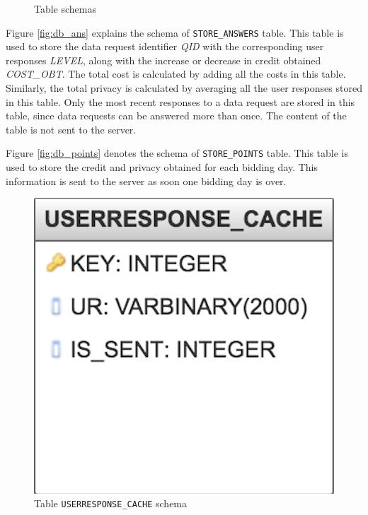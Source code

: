 \begin{figure}[htp]
 \hspace{1em}
\caption{Table schemas}
\label{fig:ts11}
\end{figure}

Figure \ref{fig:db_ans} explains the schema of \texttt{STORE\_ANSWERS} table. This table is used to store the data request identifier \textit{QID} with the corresponding
user responses \textit{LEVEL}, along with the increase or decrease in credit obtained \textit{COST\_OBT}. The total cost is calculated by adding all the costs in this table. Similarly, the total privacy is calculated by averaging all the user responses stored in this table. Only the most recent responses to a data request are stored in this table, since data requests can be answered more than once. The content of the table is not sent to the server.

Figure \ref{fig:db_points} denotes the schema of \texttt{STORE\_POINTS} table. This table is used to store the credit and privacy obtained for each bidding day.
This information is sent to the server as soon one bidding day is over.

\begin{figure}[ht!]
\centering
\includegraphics[width=0.4\linewidth]{./images/db_ur}
\caption{Table \texttt{USERRESPONSE\_CACHE} schema}
\label{fig:db_ur}
\end{figure}

